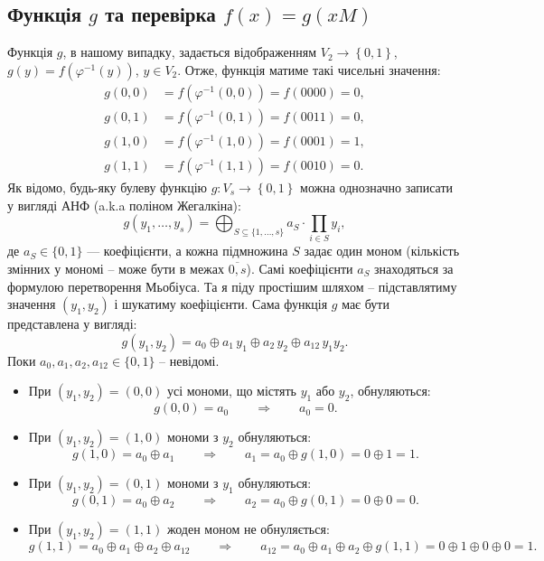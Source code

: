 \subsection{Функція \texorpdfstring{$g$}{g} та перевірка \texorpdfstring{$f(x) = g(xM)$}{fx}}
Функція $g$, в нашому випадку, задається відображенням $V_{2} \rightarrow \left\{0, 1\right\}$, 
$g(y) = f(\varphi^{-1}(y))$, $y \in V_{2}$. Отже, функція матиме такі чисельні значення:
\begin{align*}
    g(0,0) & = f(\varphi^{-1}(0,0)) = f(0000) = 0, \\
    g(0,1) & = f(\varphi^{-1}(0,1)) = f(0011) = 0, \\
    g(1,0) & = f(\varphi^{-1}(1,0)) = f(0001) = 1, \\
    g(1,1) & = f(\varphi^{-1}(1,1)) = f(0010) = 0.
\end{align*}
Як відомо, будь-яку булеву функцію $g : V_{s} \rightarrow \left\{0, 1\right\}$ можна однозначно записати у вигляді 
АНФ (a.k.a поліном Жегалкіна):
\begin{equation*}
    g(y_1, \ldots, y_s) = \bigoplus_{S \subseteq \{1,\ldots,s\}} a_S \cdot \prod_{i \in S} y_i,
\end{equation*}
де $a_S \in \{0,1\}$ --- коефіцієнти, а кожна підмножина $S$ задає один моном (кількість змінних у мономі -- може 
бути в межах $\overline{0, s}$). Самі коефіцієнти $a_{S}$ знаходяться за формулою перетворення Мьобіуса. Та я піду 
простішим шляхом -- підставлятиму значення $(y_{1}, y_{2})$ і шукатиму коефіцієнти. Сама функція $g$ має бути 
представлена у вигляді:
\begin{equation*}
    g(y_1, y_2) = a_0 \oplus a_1\, y_1 \oplus a_2\, y_2 \oplus a_{12}\, y_1 y_2.
\end{equation*}
Поки $a_0, a_1, a_2, a_{12} \in \{0,1\}$ -- невідомі.
\begin{itemize}
    \item При $(y_1, y_2) = (0,0)$ усі мономи, що містять $y_1$ або $y_2$, обнуляються:
        \begin{equation*}
            g(0,0) = a_0 \qquad\Longrightarrow\qquad a_0 = 0.
        \end{equation*}
    \item При $(y_1, y_2) = (1,0)$ мономи з $y_2$ обнуляються:
        \begin{equation*}
            g(1,0) = a_0 \oplus a_1 \qquad\Longrightarrow\qquad a_1 = a_0 \oplus g(1,0) = 0 \oplus 1 = 1.
        \end{equation*}
    \item При $(y_1, y_2) = (0,1)$ мономи з $y_1$ обнуляються:
        \begin{equation*}
            g(0,1) = a_0 \oplus a_2 \qquad\Longrightarrow\qquad a_2 = a_0 \oplus g(0,1) = 0 \oplus 0 = 0.
        \end{equation*}
    \item При $(y_1, y_2) = (1,1)$ жоден моном не обнуляється:
        \begin{equation*}
            g(1,1) = a_0 \oplus a_1 \oplus a_2 \oplus a_{12} \qquad\Longrightarrow\qquad
            a_{12} = a_0 \oplus a_1 \oplus a_2 \oplus g(1,1) = 0 \oplus 1 \oplus 0 \oplus 0 = 1.
        \end{equation*}
\end{itemize}
